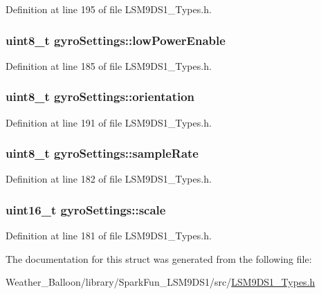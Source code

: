 Definition at line 195 of file L\+S\+M9\+D\+S1\+\_\+\+Types.\+h.

\subsubsection[{\texorpdfstring{low\+Power\+Enable}{lowPowerEnable}}]{\setlength{\rightskip}{0pt plus 5cm}uint8\+\_\+t gyro\+Settings\+::low\+Power\+Enable}\hypertarget{structgyro_settings_a296a167235d876fa79afc471399e763b}{}\label{structgyro_settings_a296a167235d876fa79afc471399e763b}


Definition at line 185 of file L\+S\+M9\+D\+S1\+\_\+\+Types.\+h.

\subsubsection[{\texorpdfstring{orientation}{orientation}}]{\setlength{\rightskip}{0pt plus 5cm}uint8\+\_\+t gyro\+Settings\+::orientation}\hypertarget{structgyro_settings_a33239fd5c4a0fd74670455008c2701ee}{}\label{structgyro_settings_a33239fd5c4a0fd74670455008c2701ee}


Definition at line 191 of file L\+S\+M9\+D\+S1\+\_\+\+Types.\+h.

\subsubsection[{\texorpdfstring{sample\+Rate}{sampleRate}}]{\setlength{\rightskip}{0pt plus 5cm}uint8\+\_\+t gyro\+Settings\+::sample\+Rate}\hypertarget{structgyro_settings_a58ebac4d1f242d6b129570396a7355b0}{}\label{structgyro_settings_a58ebac4d1f242d6b129570396a7355b0}


Definition at line 182 of file L\+S\+M9\+D\+S1\+\_\+\+Types.\+h.

\subsubsection[{\texorpdfstring{scale}{scale}}]{\setlength{\rightskip}{0pt plus 5cm}uint16\+\_\+t gyro\+Settings\+::scale}\hypertarget{structgyro_settings_a70ced5c47e97d4dd6770954117ad3a9f}{}\label{structgyro_settings_a70ced5c47e97d4dd6770954117ad3a9f}


Definition at line 181 of file L\+S\+M9\+D\+S1\+\_\+\+Types.\+h.



The documentation for this struct was generated from the following file\+:\begin{DoxyCompactItemize}
\item 
Weather\+\_\+\+Balloon/library/\+Spark\+Fun\+\_\+\+L\+S\+M9\+D\+S1/src/\hyperlink{_l_s_m9_d_s1___types_8h}{L\+S\+M9\+D\+S1\+\_\+\+Types.\+h}\end{DoxyCompactItemize}
